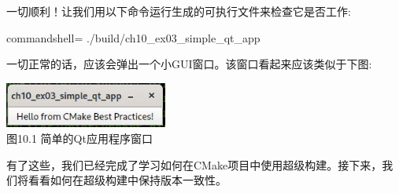 一切顺利！让我们用以下命令运行生成的可执行文件来检查它是否工作:

\begin{tcblisting}{commandshell={}}
./build/ch10_ex03_simple_qt_app
\end{tcblisting}

一切正常的话，应该会弹出一个小GUI窗口。该窗口看起来应该类似于下图:

\begin{center}
\includegraphics[width=0.4\textwidth]{content/2/chapter10/images/1.jpg}\\
图10.1 简单的Qt应用程序窗口
\end{center}

有了这些，我们已经完成了学习如何在CMake项目中使用超级构建。接下来，我们将看看如何在超级构建中保持版本一致性。

















